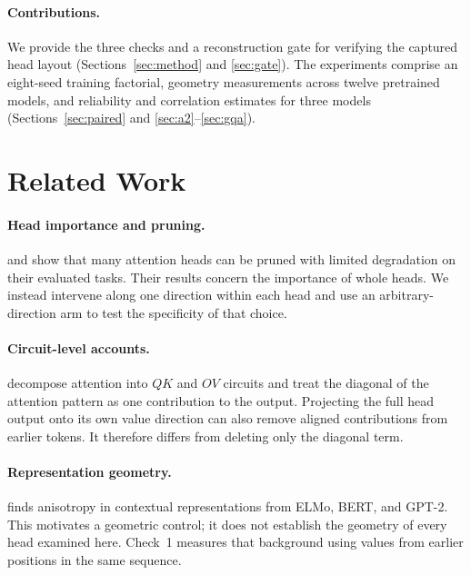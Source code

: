 \documentclass{article} %
\begin{document}
\paragraph{Contributions.}
We provide the three checks and a reconstruction gate for verifying the
captured head layout (Sections~\ref{sec:method} and \ref{sec:gate}). The
experiments comprise an eight-seed training factorial, geometry measurements
across twelve pretrained models, and reliability and correlation estimates
for three models (Sections~\ref{sec:paired} and
\ref{sec:a2}--\ref{sec:gqa}).

\section{Related Work}

\paragraph{Head importance and pruning.} \citet{michel2019sixteen} and
\citet{voita2019analyzing} show that many attention heads can be pruned with
limited degradation on their evaluated tasks. Their results concern the
importance of whole heads. We instead intervene along one direction within
each head and use an arbitrary-direction arm to test the specificity of that
choice.

\paragraph{Circuit-level accounts.} \citet{elhage2021mathematical} decompose
attention into $QK$ and $OV$ circuits and treat the diagonal of the attention
pattern as one contribution to the output. Projecting the full head output
onto its own value direction can also remove aligned contributions from
earlier tokens. It therefore differs from deleting only the diagonal term.

\paragraph{Representation geometry.} \citet{ethayarajh2019contextual} finds
anisotropy in contextual representations from ELMo, BERT, and GPT-2. This
motivates a geometric control; it does not establish the geometry of every
head examined here. Check~1 measures that background using values from
earlier positions in the same sequence.
\end{document}
